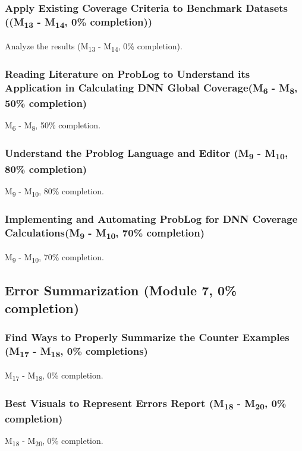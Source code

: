 \subsubsection{Apply Existing Coverage Criteria to Benchmark Datasets ((M\textsubscript{13} - M\textsubscript{14}, 0\% completion))}
Analyze the results (M\textsubscript{13} - M\textsubscript{14}, 0\% completion).

\subsubsection{Reading Literature on ProbLog to Understand its Application in Calculating DNN Global Coverage(M\textsubscript{6} - M\textsubscript{8}, 50\% completion)}
M\textsubscript{6} - M\textsubscript{8}, 50\% completion.

\subsubsection{Understand the Problog Language and Editor (M\textsubscript{9} - M\textsubscript{10}, 80\% completion)}
M\textsubscript{9} - M\textsubscript{10}, 80\% completion.

\subsubsection{Implementing and Automating ProbLog for DNN Coverage Calculations(M\textsubscript{9} - M\textsubscript{10}, 70\% completion)}
M\textsubscript{9} - M\textsubscript{10}, 70\% completion.

\subsection{Error Summarization (Module 7, 0\% completion)}
\subsubsection{Find Ways to Properly Summarize the Counter Examples (M\textsubscript{17} - M\textsubscript{18}, 0\% completions)}
M\textsubscript{17} - M\textsubscript{18}, 0\% completion.

\subsubsection{Best Visuals to Represent Errors Report (M\textsubscript{18} - M\textsubscript{20}, 0\% completion)} 
M\textsubscript{18} - M\textsubscript{20}, 0\% completion.

